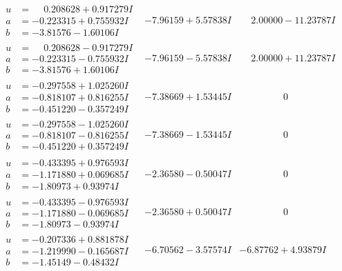 \documentclass[1p]{elsarticle_modified}
\theoremstyle{definition}
\begin{document}
$$\begin{array}{c|c|c}
\begin{aligned}
u &= \phantom{-}0.208628 + 0.917279 I \\
a &= -0.223315 + 0.755932 I \\
b &= -3.81576 - 1.60106 I\end{aligned}
 & -7.96159 + 5.57838 I & \phantom{-}2.00000 - 11.23787 I \\ \hline\begin{aligned}
u &= \phantom{-}0.208628 - 0.917279 I \\
a &= -0.223315 - 0.755932 I \\
b &= -3.81576 + 1.60106 I\end{aligned}
 & -7.96159 - 5.57838 I & \phantom{-}2.00000 + 11.23787 I \\ \hline\begin{aligned}
u &= -0.297558 + 1.025260 I \\
a &= -0.818107 + 0.816255 I \\
b &= -0.451220 - 0.357249 I\end{aligned}
 & -7.38669 + 1.53445 I & \phantom{-0.000000 } 0 \\ \hline\begin{aligned}
u &= -0.297558 - 1.025260 I \\
a &= -0.818107 - 0.816255 I \\
b &= -0.451220 + 0.357249 I\end{aligned}
 & -7.38669 - 1.53445 I & \phantom{-0.000000 } 0 \\ \hline\begin{aligned}
u &= -0.433395 + 0.976593 I \\
a &= -1.171880 + 0.069685 I \\
b &= -1.80973 + 0.93974 I\end{aligned}
 & -2.36580 - 0.50047 I & \phantom{-0.000000 } 0 \\ \hline\begin{aligned}
u &= -0.433395 - 0.976593 I \\
a &= -1.171880 - 0.069685 I \\
b &= -1.80973 - 0.93974 I\end{aligned}
 & -2.36580 + 0.50047 I & \phantom{-0.000000 } 0 \\ \hline\begin{aligned}
u &= -0.207336 + 0.881878 I \\
a &= -1.219990 - 0.165687 I \\
b &= -1.45149 - 0.48432 I\end{aligned}
 & -6.70562 - 3.57574 I & -6.87762 + 4.93879 I \\ \hline\begin{aligned}

\end{aligned}
\end{array}$$
\end{document}
